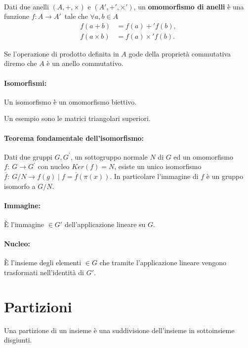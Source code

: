 \documentclass[a4paper]{article}
\begin{document}
        \paragraph{}
        Dati due anelli $(A, +, \times)$ e $(A', +', \times')$, \newline
        un \textbf{omomorfismo di anelli} \`{e} una funzione $f\!: A \to A'\,\! $ tale che $\forall a,b \in A$
        \[
                \begin{aligned}
                        f(a + b)     & = f(a) +' f(b), \\
                        f(a \times b) & = f(a) \times' f(b).
                \end{aligned}
        \]

        Se l’operazione di prodotto definita in $A$ gode della propriet\`{a} commutativa diremo che $A$ \`{e} un anello commutativo.

        \paragraph{Isomorfismi:}
        Un isomorfismo \`{e} un omomorfismo biettivo.

        Un esempio sono le matrici triangolari superiori.

        \paragraph{Teorema fondamentale dell'isomorfismo:}
        Dati due gruppi $ G, G^{\prime} $, un sottogruppo normale $N$ di $G$ ed un omomorfismo $ f:\ G \to G^{\prime} $
        con nucleo $ Ker(f) = N $, esiste un unico isomorfismo $ \overline{f}:\ G/N \to f(g) \mid f = \overline{f}(\pi(x)) $. In particolare l'immagine di $f$ \`{e} un gruppo isomorfo a $ G / N$.

        \paragraph{Immagine:}
        \`{E} l'immagine $\in G'$ dell'applicazione lineare su $G$.

        \paragraph{Nucleo:}
        \`{E} l'insieme degli elementi $\in G$ che tramite l'applicazione lineare vengono trasformati nell'identit\`{a} di $G'$.


        \section*{Partizioni}
        Una partizione di un insieme \`{e} una suddivisione dell'insieme in sottoinsieme disgiunti.
\end{document}
